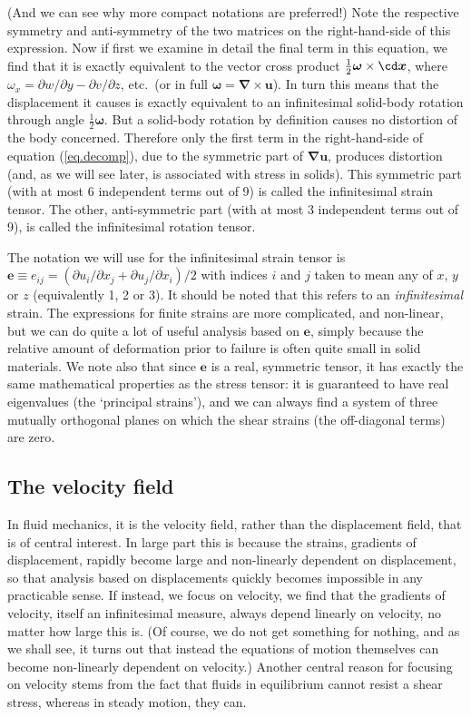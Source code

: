 \documentclass[a4paper,11pt]		{report}
\begin{document}
(And we can see why more compact notations are preferred!) Note the
respective symmetry and anti-symmetry of the two matrices on the
right-hand-side of this expression. Now if first we examine in detail
the final term in this equation, we find that it is exactly equivalent
to the vector cross product $\frac{1}{2}\bm{\omega}\times\cd \bm{x}$,
where $\omega_{x}=\partial w/\partial y - \partial v/\partial z$,
etc.\ (or in full $\bm{\omega}=\bm{\nabla}\times\bm{u}$). In turn this
means that the displacement it causes is exactly equivalent to an
infinitesimal solid-body rotation through angle
$\frac{1}{2}\bm{\omega}$. But a solid-body rotation by definition
causes no distortion of the body concerned. Therefore only the first
term in the right-hand-side of equation (\ref{eq.decomp}), due to the
symmetric part of $\bm{\nabla u}$, produces distortion (and, as we
will see later, is associated with stress in solids). This symmetric
part (with at most 6 independent terms out of 9) is called the
infinitesimal strain tensor. The other, anti-symmetric part (with at
most 3 independent terms out of 9), is called the infinitesimal
rotation tensor.

The notation we will use for the infinitesimal strain tensor is
$\bm{e}\equiv e_{ij}=(\partial u_i/\partial x_j + \partial
u_j/\partial x_i)/2$ with indices $i$ and $j$ taken to mean any of
$x$, $y$ or $z$ (equivalently 1, 2 or 3). It should be noted that this
refers to an \emph{infinitesimal} strain. The expressions for finite
strains are more complicated, and non-linear, but we can do quite a
lot of useful analysis based on $\bm{e}$, simply because the relative
amount of deformation prior to failure is often quite small in solid
materials. We note also that since $\bm{e}$ is a real, symmetric
tensor, it has exactly the same mathematical properties as the stress
tensor: it is guaranteed to have real eigenvalues (the `principal
strains'), and we can always find a system of three mutually
orthogonal planes on which the shear strains (the off-diagonal terms)
are zero.

\subsection{The velocity field}

In fluid mechanics, it is the velocity field, rather than the
displacement field, that is of central interest. In large part this is
because the strains, \ie gradients of displacement, rapidly become
large and non-linearly dependent on displacement, so that analysis
based on displacements quickly becomes impossible in any practicable
sense. If instead, we focus on velocity, we find that the gradients of
velocity, itself an infinitesimal measure, always depend linearly on
velocity, no matter how large this is.  (Of course, we do not get
something for nothing, and as we shall see, it turns out that instead
the equations of motion themselves can become non-linearly dependent
on velocity.) Another central reason for focusing on velocity stems
from the fact that fluids in equilibrium cannot resist a shear stress,
whereas in steady motion, they can.
\end{document}
